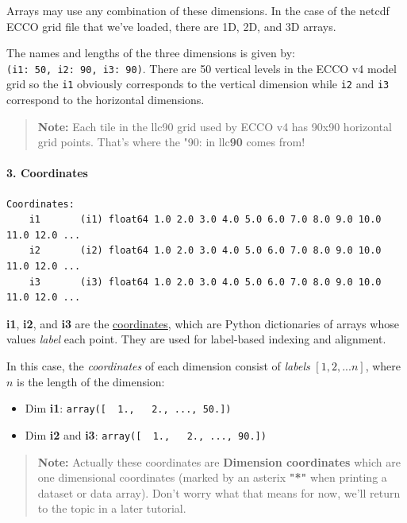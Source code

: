 \documentclass[11pt]{article}
\providecommand{\tightlist}{%
      \setlength{\itemsep}{0pt}\setlength{\parskip}{0pt}}
\begin{document}
Arrays may use any combination of these dimensions. In the case of the
netcdf ECCO grid file that we've loaded, there are 1D, 2D, and 3D
arrays.

The names and lengths of the three dimensions is given by:
\texttt{(i1:\ 50,\ i2:\ 90,\ i3:\ 90)}. There are 50 vertical levels in
the ECCO v4 model grid so the \texttt{i1} obviously corresponds to the
vertical dimension while \texttt{i2}\textbar{} and \texttt{i3}
correspond to the horizontal dimensions.

\begin{quote}
\textbf{Note:} Each tile in the llc90 grid used by ECCO v4 has 90x90
horizontal grid points. That's where the "90: in llc\textbf{90} comes
from!
\end{quote}

\paragraph{3. Coordinates}\label{coordinates}

\begin{verbatim}
Coordinates:
    i1       (i1) float64 1.0 2.0 3.0 4.0 5.0 6.0 7.0 8.0 9.0 10.0 11.0 12.0 ...
    i2       (i2) float64 1.0 2.0 3.0 4.0 5.0 6.0 7.0 8.0 9.0 10.0 11.0 12.0 ...
    i3       (i3) float64 1.0 2.0 3.0 4.0 5.0 6.0 7.0 8.0 9.0 10.0 11.0 12.0 ... 
\end{verbatim}

\textbf{i1}, \textbf{i2}, and \textbf{i3} are the
\href{http://xarray.pydata.org/en/stable/data-structures.html\#coordinates}{coordinates},
which are Python dictionaries of arrays whose values \emph{label} each
point. They are used for label-based indexing and alignment.

In this case, the \emph{coordinates} of each dimension consist of
\emph{labels} \([1, 2, ... n]\), where \(n\) is the length of the
dimension:

\begin{itemize}
\tightlist
\item
  Dim \textbf{i1}: \texttt{array({[}\ \ 1.,\ \ \ 2.,\ ...,\ 50.{]})}
\item
  Dim \textbf{i2} and \textbf{i3}:
  \texttt{array({[}\ \ 1.,\ \ \ 2.,\ ...,\ 90.{]})}
\end{itemize}

\begin{quote}
\textbf{Note:} Actually these coordinates are \textbf{Dimension
coordinates} which are one dimensional coordinates (marked by an asterix
\textbf{"*"} when printing a dataset or data array). Don't worry what
that means for now, we'll return to the topic in a later tutorial.
\end{quote}
\end{document}
